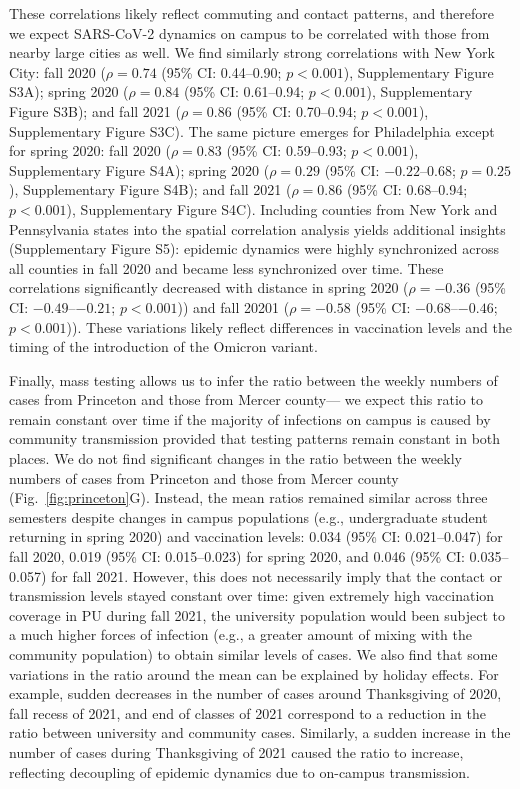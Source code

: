\documentclass[12pt]{article}
\newcommand{\fref}[1]{Fig.~\ref{fig:#1}}
\begin{document}
These correlations likely reflect commuting and contact patterns, and therefore we expect SARS-CoV-2 dynamics on campus to be correlated with those from nearby large cities as well. 
We find similarly strong correlations with New York City: fall 2020 ($\rho = 0.74$ (95\% CI: 0.44--0.90; $p < 0.001$), Supplementary Figure S3A); spring 2020 ($\rho = 0.84$ (95\% CI: 0.61--0.94; $p < 0.001$), Supplementary Figure S3B); and fall 2021 ($\rho = 0.86$ (95\% CI: 0.70--0.94; $p < 0.001$), Supplementary Figure S3C).
The same picture emerges for Philadelphia except for spring 2020: fall 2020 ($\rho = 0.83$ (95\% CI: 0.59--0.93; $p < 0.001$), Supplementary Figure S4A); spring 2020 ($\rho = 0.29$ (95\% CI: $-0.22$--0.68; $p = 0.25$), Supplementary Figure S4B); and fall 2021 ($\rho = 0.86$ (95\% CI: 0.68--0.94; $p < 0.001$), Supplementary Figure S4C).
Including counties from New York and Pennsylvania states into the spatial correlation analysis yields additional insights (Supplementary Figure S5):
epidemic dynamics were highly synchronized across all counties in fall 2020 and became less synchronized over time. 
These correlations significantly decreased with distance in spring 2020 ($\rho = -0.36$ (95\% CI: $-0.49$--$-0.21$; $p < 0.001$)) and fall 20201 ($\rho = -0.58$ (95\% CI: $-0.68$--$-0.46$; $p < 0.001$)).
These variations likely reflect differences in vaccination levels and the timing of the introduction of the Omicron variant.

Finally, mass testing allows us to infer the ratio between the weekly numbers of cases from Princeton and those from Mercer county---
we expect this ratio to remain constant over time if the majority of infections on campus is caused by community transmission provided that testing patterns remain constant in both places.
We do not find significant changes in the ratio between the weekly numbers of cases from Princeton and those from Mercer county (\fref{princeton}G).
Instead, the mean ratios remained similar across three semesters despite changes in campus populations (e.g., undergraduate student returning in spring 2020) and vaccination levels: 0.034 (95\% CI: 0.021--0.047) for fall 2020, 0.019 (95\% CI: 0.015--0.023) for spring 2020, and 0.046 (95\% CI: 0.035--0.057) for fall 2021.
However, this does not necessarily imply that the contact or transmission levels stayed constant over time: given extremely high vaccination coverage in PU during fall 2021, the university population would been subject to a much higher forces of infection (e.g., a greater amount of mixing with the community population) to obtain similar levels of cases.
We also find that some variations in the ratio around the mean can be explained by holiday effects.
For example, sudden decreases in the number of cases around Thanksgiving of 2020, fall recess of 2021, and end of classes of 2021 correspond to a reduction in the ratio between university and community cases.
Similarly, a sudden increase in the number of cases during Thanksgiving of 2021 caused the ratio to increase, reflecting decoupling of epidemic dynamics due to on-campus transmission.
\end{document}
